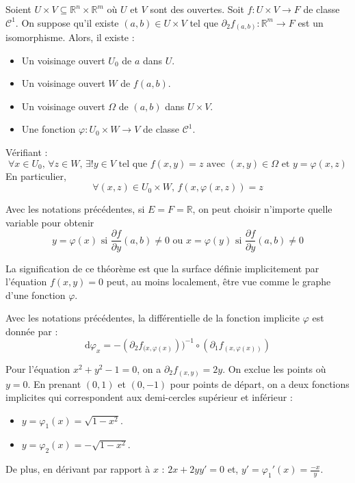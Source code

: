 	\begin{theorem}
		Soient $U \times V \subseteq \mathbb{R}^n \times \mathbb{R}^m$ où $U$ et $V$ sont des ouvertes. Soit $f : U \times V \rightarrow F$ de classe $\mathcal{C}^1$. On suppose qu'il existe $(a,b) \in U \times V$ tel que $\partial_2 f_{(a,b)} : \mathbb{R}^m \rightarrow F$ est un isomorphisme. Alors, il existe :
		\begin{itemize}
			\item Un voisinage ouvert $U_0$ de $a$ dans $U$.
			\item Un voisinage ouvert $W$ de $f(a,b)$.
			\item Un voisinage ouvert $\Omega$ de $(a,b)$ dans $U \times V$.
			\item Une fonction $\varphi : U_0 \times W \rightarrow V$ de classe $\mathcal{C}^1$.
		\end{itemize}
		Vérifiant :
		\[ \forall x \in U_0, \, \forall z \in W, \, \exists! y \in V \text{ tel que } f(x,y)=z \text{ avec } (x, y) \in \Omega \text{ et } y=\varphi(x,z) \]
		En particulier,
		\[ \forall (x,z) \in U_0 \times W, \, f(x, \varphi(x,z)) = z \]
	\end{theorem}
	
	
	\begin{remark}
		Avec les notations précédentes, si $E = F = \mathbb{R}$, on peut choisir n'importe quelle variable pour obtenir
		\[ y = \varphi(x) \text{ si } \frac{\partial f}{\partial y}(a,b) \neq 0 \text{ ou } x = \varphi(y) \text{ si } \frac{\partial f}{\partial y}(a,b) \neq 0 \]
	\end{remark}
	
	
	\begin{remark}
		La signification de ce théorème est que la surface définie implicitement par l'équation $f(x,y)=0$ peut, au moins localement, être vue comme le graphe d'une fonction $\varphi$.
	\end{remark}
	
	\begin{proposition}
		Avec les notations précédentes, la différentielle de la fonction implicite $\varphi$ est donnée par :
		\[ \mathrm{d}\varphi_x = -(\partial_2 f_{(x, \varphi(x)}))^{-1} \circ (\partial_1 f_{(x, \varphi(x))}) \]
	\end{proposition}
	
	\begin{example}
		Pour l'équation $x^2 + y^2 - 1 = 0$, on a $\partial_2 f_{(x,y)} = 2y$. On exclue les points où $y = 0$. En prenant $(0,1)$ et $(0,-1)$ pour points de départ, on a deux fonctions implicites qui correspondent aux demi-cercles supérieur et inférieur :
		\begin{itemize}
			\item $y = \varphi_1(x) = \sqrt{1-x^2}$.
			\item $y = \varphi_2(x) = -\sqrt{1-x^2}$.
		\end{itemize}
		De plus, en dérivant par rapport à $x$ : $2x + 2yy' = 0$ et, $y' = \varphi_1'(x) = \frac{-x}{y}$.
	\end{example}
	
